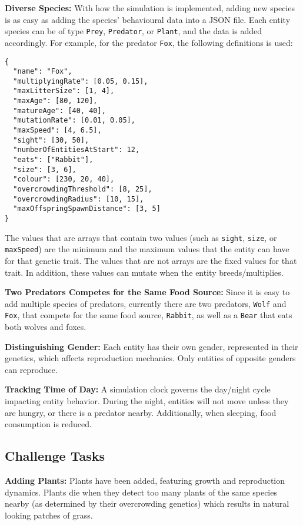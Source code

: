 \documentclass[10pt, a4paper]{scrartcl}
\begin{document}
\begin{multicols}{2}
    \noindent \textbf{Diverse Species:} With how the simulation is implemented, adding new species is as easy as adding
    the species' behavioural data into a JSON file. Each entity species can be of type \verb|Prey|, \verb|Predator|,
    or \verb|Plant|, and the data is added accordingly. For example, for the predator \verb|Fox|, the following definitions
    is used:
    \begin{verbatim}
{
  "name": "Fox",
  "multiplyingRate": [0.05, 0.15],
  "maxLitterSize": [1, 4],
  "maxAge": [80, 120],
  "matureAge": [40, 40],
  "mutationRate": [0.01, 0.05],
  "maxSpeed": [4, 6.5],
  "sight": [30, 50],
  "numberOfEntitiesAtStart": 12,
  "eats": ["Rabbit"],
  "size": [3, 6],
  "colour": [230, 20, 40],
  "overcrowdingThreshold": [8, 25],
  "overcrowdingRadius": [10, 15],
  "maxOffspringSpawnDistance": [3, 5]
}
    \end{verbatim}
    \noindent The values that are arrays that contain two values (such as \verb|sight|, \verb|size|, or \verb|maxSpeed|)
    are the minimum and the maximum values that the entity can have for that genetic trait. The values that are not arrays are the fixed values for that trait. In addition, these values can mutate when the entity breeds/multiplies.

    \noindent \textbf{Two Predators Competes for the Same Food Source:}
    Since it is easy to add multiple species of predators, currently there are two predators, \verb|Wolf| and \verb|Fox|,
    that compete for the same food source, \verb|Rabbit|, as well as a \verb|Bear| that eats both wolves and foxes.

    \noindent \textbf{Distinguishing Gender:} Each entity has their own gender, represented in their genetics,
    which affects reproduction mechanics. Only entities of opposite genders can reproduce.

    \noindent \textbf{Tracking Time of Day:} A simulation clock governs the day/night cycle impacting entity behavior.
    During the night, entities will not move unless they are hungry, or there is a predator nearby. Additionally, when sleeping, food consumption is reduced.

    \subsection{Challenge Tasks}

    \noindent \textbf{Adding Plants:} Plants have been added, featuring growth and reproduction dynamics. Plants die when they detect too many plants of the same species nearby (as determined by their overcrowding genetics) which results in natural looking patches of grass.


\end{multicols}
\end{document}
